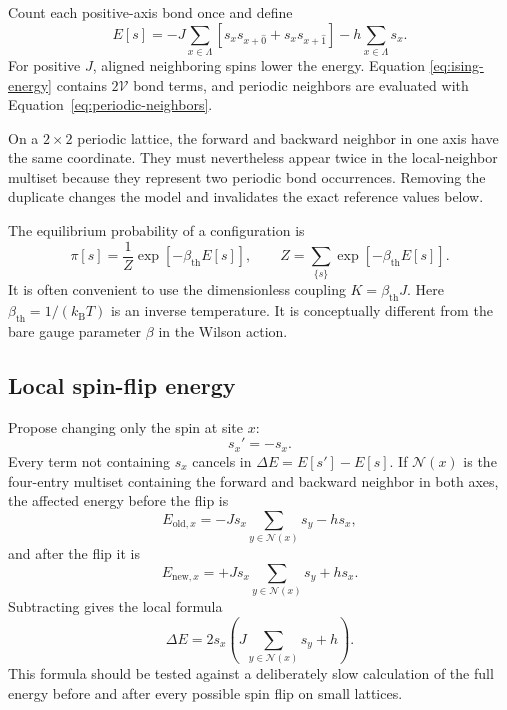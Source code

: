\documentclass[11pt]{article}
\newcommand{\Vlat}{\mathcal{V}}
\begin{document}
Count each positive-axis bond once and define
\begin{equation}
  E[s]
  =-J\sum_{x\in\Lambda}
      \left[s_xs_{x+\hat 0}+s_xs_{x+\hat 1}\right]
    -h\sum_{x\in\Lambda}s_x.
  \label{eq:ising-energy}
\end{equation}
For positive \(J\), aligned neighboring spins lower the energy.  Equation
\eqref{eq:ising-energy} contains \(2\Vlat\) bond terms, and periodic neighbors
are evaluated with Equation~\eqref{eq:periodic-neighbors}.

On a \(2\times2\) periodic lattice, the forward and backward neighbor in one
axis have the same coordinate.  They must nevertheless appear twice in the
local-neighbor multiset because they represent two periodic bond occurrences.
Removing the duplicate changes the model and invalidates the exact reference
values below.

The equilibrium probability of a configuration is
\begin{equation}
  \pi[s]=\frac{1}{Z}\exp\!\left[-\beta_{\mathrm{th}}E[s]\right],
  \qquad
  Z=\sum_{\{s\}}\exp\!\left[-\beta_{\mathrm{th}}E[s]\right].
  \label{eq:ising-boltzmann}
\end{equation}
It is often convenient to use the dimensionless coupling
\(K=\beta_{\mathrm{th}}J\).  Here \(\beta_{\mathrm{th}}=1/(k_{\mathrm B}T)\)
is an inverse temperature.  It is conceptually different from the bare gauge
parameter \(\beta\) in the Wilson action.

\subsection{Local spin-flip energy}

Propose changing only the spin at site \(x\):
\begin{equation}
  s_x'=-s_x.
  \label{eq:ising-flip}
\end{equation}
Every term not containing \(s_x\) cancels in
\(\Delta E=E[s']-E[s]\).  If \(\mathcal N(x)\) is the four-entry multiset
containing the forward and backward neighbor in both axes, the affected energy
before the flip is
\begin{equation}
  E_{\mathrm{old},x}
  =-J s_x\sum_{y\in\mathcal N(x)}s_y-hs_x,
  \label{eq:ising-old-local}
\end{equation}
and after the flip it is
\begin{equation}
  E_{\mathrm{new},x}
  =+J s_x\sum_{y\in\mathcal N(x)}s_y+hs_x.
  \label{eq:ising-new-local}
\end{equation}
Subtracting gives the local formula
\begin{equation}
  \boxed{\Delta E
  =2s_x\left(J\sum_{y\in\mathcal N(x)}s_y+h\right)}.
  \label{eq:ising-delta-energy}
\end{equation}
This formula should be tested against a deliberately slow calculation of the
full energy before and after every possible spin flip on small lattices.
\end{document}
